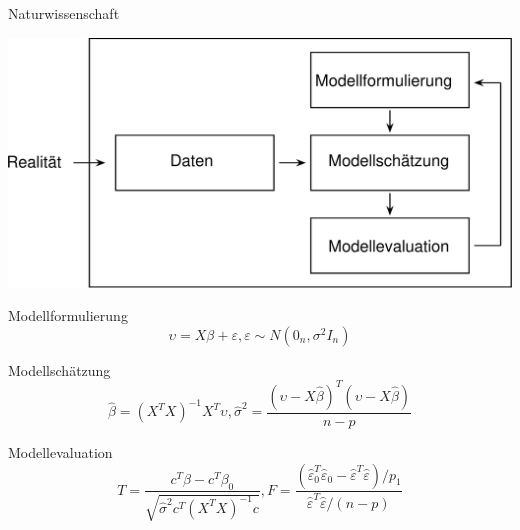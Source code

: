 \documentclass[
  8pt,
  ignorenonframetext,
]{beamer}
\begin{document}
\begin{frame}{}
\protect\hypertarget{section-2}{}
\large

Naturwissenschaft \vspace{7mm}

\begin{center}\includegraphics[width=0.9\linewidth]{5_Abbildungen/alm_5_wissenschaft} \end{center}
\end{frame}

\begin{frame}{}
\protect\hypertarget{section-3}{}
\vspace{1mm}
\normalsize

Modellformulierung \vspace{1mm} \small \begin{equation}
\upsilon = X\beta + \varepsilon, \varepsilon \sim N(0_n,\sigma^2I_n)
\end{equation} \vspace{5mm}

\normalsize

Modellschätzung \small \begin{equation}
\hat{\beta} = (X^TX)^{-1} X^T\upsilon,  \hat{\sigma}^2 = \frac{(\upsilon-X\hat{\beta})^T(\upsilon-X\hat{\beta})}{n-p}
\end{equation} \vspace{4mm}

\normalsize

Modellevaluation \small \begin{equation}
T = \frac{c^T\hat{\beta} - c^T\beta_0}{\sqrt{\hat{\sigma}^2c^T(X^TX)^{-1}c}},
F = \frac{(\hat{\varepsilon}_0^T\hat{\varepsilon}_0 - \hat{\varepsilon}^T\hat{\varepsilon})/p_1}{\hat{\varepsilon}^T\hat{\varepsilon}/(n-p)}
\end{equation}
\end{frame}
\end{document}
